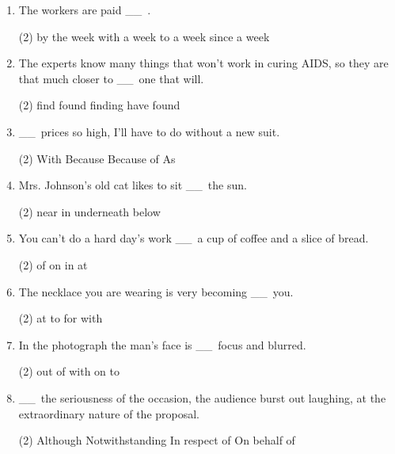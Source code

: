 \documentclass{yufa}
\newcommand\ttu{ \_\_\ }
\begin{document}
\begin{enumerate}
\item The workers are paid \ttu.
  \begin{tasks}(2)
    \task by the week
    \task with a week
    \task to a week
    \task since a week
  \end{tasks}

\item The experts know many things that won't work in curing AIDS, so they are that much closer to \ttu one that will.
  \begin{tasks}(2)
    \task find
    \task found
    \task finding
    \task have found
  \end{tasks}

\item \ttu prices so high, I'll have to do without a new suit.
  \begin{tasks}(2)
    \task With
    \task Because
    \task Because of
    \task As
  \end{tasks}

\item Mrs. Johnson's old cat likes to sit \ttu the sun.
  \begin{tasks}(2)
    \task near
    \task in
    \task underneath
    \task below
  \end{tasks}

\item You can't do a hard day's work \ttu a cup of coffee and a slice of bread.
  \begin{tasks}(2)
    \task of
    \task on
    \task in
    \task at
  \end{tasks}

\item The necklace you are wearing is very becoming \ttu you.
  \begin{tasks}(2)
    \task at
    \task to
    \task for
    \task with
  \end{tasks}

\item In the photograph the man's face is \ttu focus and blurred.
  \begin{tasks}(2)
    \task out of
    \task with
    \task on
    \task to
  \end{tasks}

\item \ttu the seriousness of the occasion, the audience burst out laughing, at the extraordinary nature of the proposal.
  \begin{tasks}(2)
    \task Although
    \task Notwithstanding
    \task In respect of
    \task On behalf of
  \end{tasks}


\end{enumerate}
\end{document}

